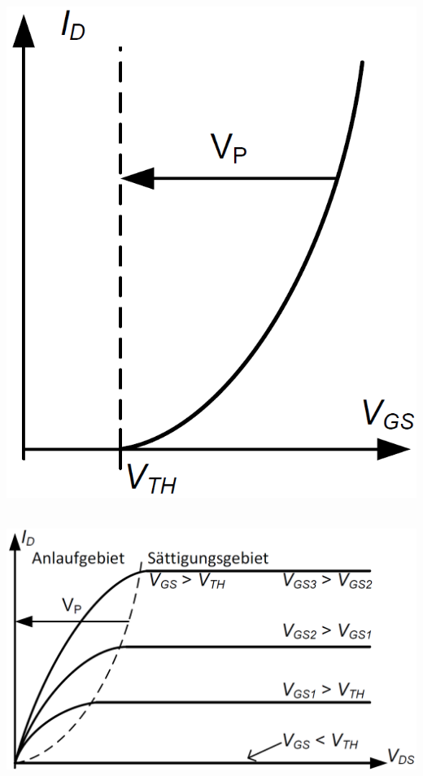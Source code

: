 \begin{minipage}[t]{0.3\columnwidth}
    \centering{} \\
    \includegraphics[align=c, width=\columnwidth]{images/mos_fet_eingangskennlinie.png}
\end{minipage}
\hfill
\begin{minipage}[t]{0.6\columnwidth}
    \centering{} \\
    \includegraphics[align=c, width=\columnwidth]{images/mos_fet_ausgangskennlinien.png}
\end{minipage}


